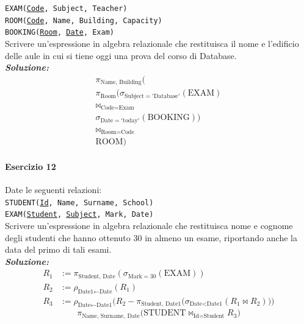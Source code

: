 \documentclass[12pt]{extarticle}
\begin{document}
\noindent \texttt{EXAM(\underline{Code}, Subject, Teacher)}\\
\texttt{ROOM(\underline{Code}, Name, Building, Capacity)}\\
\texttt{BOOKING(\underline{Room}, \underline{Date}, Exam)}\\[0.5em]

\noindent Scrivere un'espressione in algebra relazionale che restituisca il nome e l'edificio delle aule in cui si tiene oggi una prova del corso di Database.\\

\noindent \textbf{\textit{Soluzione:}}
\[
\begin{gathered}
\pi_{\text{Name, Building}} \Big( \\
\pi_{\text{Room}} \big( \sigma_{\text{Subject} = '\text{Database}'}(\text{EXAM}) \\
\bowtie_{\text{Code} = \text{Exam}} \\
\sigma_{\text{Date} = '\text{today}'}(\text{BOOKING}) \big) \\
\bowtie_{\text{Room} = \text{Code}} \\
\text{ROOM} \Big)
\end{gathered}
\]

\vspace{1em}

\paragraph{Esercizio 12} Date le seguenti relazioni:\\

\noindent \texttt{STUDENT(\underline{Id}, Name, Surname, School)}\\
\texttt{EXAM(\underline{Student}, \underline{Subject}, Mark, Date)}\\[0.5em]

\noindent Scrivere un'espressione in algebra relazionale che restituisca nome e cognome degli studenti che hanno ottenuto 30 in almeno un esame, riportando anche la data del primo di tali esami.\\

\noindent \textbf{\textit{Soluzione:}}
\[
\begin{aligned}
R_1 &:= \pi_{\text{Student, Date}}(\sigma_{\text{Mark} = 30}(\text{EXAM})) \\[0.5em]
R_2 &:= \rho_{\text{Date1} \leftarrow \text{Date}}(R_1) \\[0.5em]
R_3 &:= \rho_{\text{Date} \leftarrow \text{Date1}} \Big( R_2 - \pi_{\text{Student, Date1}} \big( \sigma_{\text{Date} < \text{Date1}}(R_1 \bowtie R_2) \big) \Big)
\end{aligned}
\]
\[
\pi_{\text{Name, Surname, Date}} \big( \text{STUDENT} \bowtie_{\text{Id} = \text{Student}} R_3 \big)
\]
\end{document}

